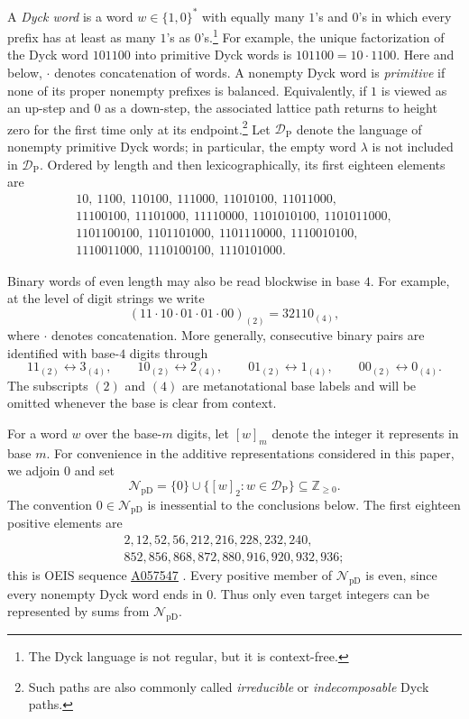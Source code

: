 \documentclass[12pt]{article}
\theoremstyle{plain}
\theoremstyle{definition}
\theoremstyle{plain}
\newcommand{\val}[2]{[#1]_{#2}}
\newcommand{\NpD}{\mathcal{N}_{\mathrm{pD}}}
\newcommand{\DP}{\mathcal{D}_{\mathrm{P}}}
\newcommand{\seqnum}[1]{\href{https://oeis.org/#1}{\rm \underline{#1}}}
\begin{document}
A \emph{Dyck word} is a word $w\in\{1,0\}^*$ with equally many $1$'s
and $0$'s in which every prefix has at least as many $1$'s as $0$'s.\footnote{The
Dyck language is not regular, but it is context-free.}  For example, the
unique factorization of the Dyck word $101100$ into primitive Dyck words is
$101100=10\cdot1100$.  Here and below, $\cdot$ denotes concatenation of
words.  A nonempty Dyck word is \emph{primitive} if none of
its proper nonempty prefixes is balanced.  Equivalently, if $1$ is viewed as
an up-step and $0$ as a down-step, the associated lattice path returns to
height zero for the first time only at its endpoint.\footnote{Such paths are
also commonly called \emph{irreducible} or \emph{indecomposable} Dyck paths.}
Let $\DP$ denote the language of nonempty primitive Dyck words; in
particular, the empty word $\lambda$ is not included in $\DP$.  Ordered by length and then
lexicographically, its first eighteen elements are
\[
\begin{gathered}
10,\ 1100,\ 110100,\ 111000,\ 11010100,\ 11011000,\\
11100100,\ 11101000,\ 11110000,\ 1101010100,\ 1101011000,\\
1101100100,\ 1101101000,\ 1101110000,\ 1110010100,\\
1110011000,\ 1110100100,\ 1110101000.
\end{gathered}
\]

Binary words of even length may also be read blockwise in base $4$.
For example, at the level of digit strings we write
\[
 (11\cdot10\cdot01\cdot01\cdot00)_{(2)}=32110_{(4)},
\]
where $\cdot$ denotes concatenation.  More generally, consecutive binary
pairs are identified with base-$4$ digits through
\[
 11_{(2)}\longleftrightarrow3_{(4)},\qquad
 10_{(2)}\longleftrightarrow2_{(4)},\qquad
 01_{(2)}\longleftrightarrow1_{(4)},\qquad
 00_{(2)}\longleftrightarrow0_{(4)}.
\]
The subscripts $(2)$ and $(4)$ are metanotational base labels and will be
omitted whenever the base is clear from context.

For a word $w$ over the base-$m$ digits, let $\val{w}{m}$ denote the
integer it represents in base $m$.  For convenience in the additive
representations considered in this paper, we adjoin $0$ and set
\[
 \NpD=\{0\}\cup\{\val{w}{2}:w\in\DP\}
 \subseteq\mathbb Z_{\geq0}.
\]
The convention $0\in\NpD$ is inessential to the conclusions below.  The
first eighteen positive elements are
\[
\begin{gathered}
2,12,52,56,212,216,228,232,240,\\
852,856,868,872,880,916,920,932,936;
\end{gathered}
\]
this is OEIS sequence \seqnum{A057547} \cite{OEIS-A057547}.  Every positive
member of $\NpD$ is even, since every nonempty Dyck word ends in $0$.
Thus only even target integers can be represented by sums from $\NpD$.
\end{document}
